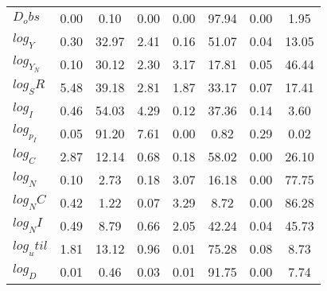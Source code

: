 \begin{center}
\begin{longtable}{lccccccc}
$D_obs     $	 & 	        0.00	 & 	        0.10	 & 	        0.00	 & 	        0.00	 & 	       97.94	 & 	        0.00	 & 	        1.95 \\ 
$log_Y     $	 & 	        0.30	 & 	       32.97	 & 	        2.41	 & 	        0.16	 & 	       51.07	 & 	        0.04	 & 	       13.05 \\ 
$log_Y_N   $	 & 	        0.10	 & 	       30.12	 & 	        2.30	 & 	        3.17	 & 	       17.81	 & 	        0.05	 & 	       46.44 \\ 
$log_SR    $	 & 	        5.48	 & 	       39.18	 & 	        2.81	 & 	        1.87	 & 	       33.17	 & 	        0.07	 & 	       17.41 \\ 
$log_I     $	 & 	        0.46	 & 	       54.03	 & 	        4.29	 & 	        0.12	 & 	       37.36	 & 	        0.14	 & 	        3.60 \\ 
$log_p_I   $	 & 	        0.05	 & 	       91.20	 & 	        7.61	 & 	        0.00	 & 	        0.82	 & 	        0.29	 & 	        0.02 \\ 
$log_C     $	 & 	        2.87	 & 	       12.14	 & 	        0.68	 & 	        0.18	 & 	       58.02	 & 	        0.00	 & 	       26.10 \\ 
$log_N     $	 & 	        0.10	 & 	        2.73	 & 	        0.18	 & 	        3.07	 & 	       16.18	 & 	        0.00	 & 	       77.75 \\ 
$log_NC    $	 & 	        0.42	 & 	        1.22	 & 	        0.07	 & 	        3.29	 & 	        8.72	 & 	        0.00	 & 	       86.28 \\ 
$log_NI    $	 & 	        0.49	 & 	        8.79	 & 	        0.66	 & 	        2.05	 & 	       42.24	 & 	        0.04	 & 	       45.73 \\ 
$log_util  $	 & 	        1.81	 & 	       13.12	 & 	        0.96	 & 	        0.01	 & 	       75.28	 & 	        0.08	 & 	        8.73 \\ 
$log_D     $	 & 	        0.01	 & 	        0.46	 & 	        0.03	 & 	        0.01	 & 	       91.75	 & 	        0.00	 & 	        7.74 \\ 
\end{longtable}
 \end{center}
